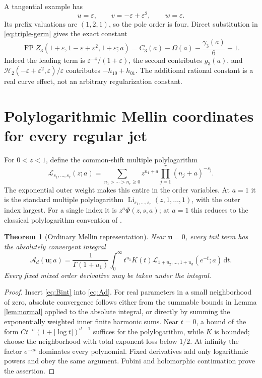 \documentclass[11pt,a4paper]{article}
\numberwithin{equation}{section}
\newtheorem{theorem}{Theorem}[section]
\theoremstyle{definition}\newtheorem{definition}[theorem]{Definition}
\theoremstyle{remark}\newtheorem{remark}[theorem]{Remark}
\DeclareMathOperator{\Li}{Li}
\DeclareMathOperator{\FP}{FP}
\newcommand{\eps}{\varepsilon}
\newcommand{\HH}{\mathcal H}
\newcommand{\Atail}{\mathcal A}
\newcommand{\LL}{\mathcal L}
\newcommand{\dd}{\,\mathrm d}
\begin{document}
A tangential example has
\[
 u=\eps,\qquad v=-\eps+\eps^2,\qquad w=\eps.
\]
Its prefix valuations are $(1,2,1)$, so the pole order is four. Direct
substitution in \eqref{eq:triple-germ} gives the exact constant
\begin{equation}\label{eq:tangent}
 \boxed{\displaystyle
 \FP Z_3(1+\eps,1-\eps+\eps^2,1+\eps;a)
   =C_3(a)-\Omega(a)-\frac{\gamma_3(a)}6+1.}
\end{equation}
Indeed the leading term is $\eps^{-4}/(1+\eps)$, the second contributes
$g_3(a)$, and $\HH_2(-\eps+\eps^2,\eps)/\eps$ contributes
$-h_{10}+h_{01}$. The additional rational constant is a real curve effect,
not an arbitrary regularization constant.

\section{Polylogarithmic Mellin coordinates for every regular jet}
\label{sec:mellin}

For $0<z<1$, define the common-shift multiple polylogarithm
\begin{equation}\label{eq:Lshift}
 \LL_{s_1,\ldots,s_r}(z;a)
 =\sum_{n_1>\cdots>n_r\ge0}z^{n_1+a}
                       \prod_{j=1}^{r}(n_j+a)^{-s_j}.
\end{equation}
The exponential outer weight makes this entire in the order variables.
At $a=1$ it is the standard multiple polylogarithm
$\Li_{s_1,\ldots,s_r}(z,1,\ldots,1)$, with the outer index largest.
For a single index it is $z^a\Phi(z,s,a)$; at $a=1$ this
reduces to the classical polylogarithm convention of \cite{dlmf-polylog}.

\begin{theorem}[Ordinary Mellin representation]\label{thm:Mellin}
Near $\bm u=0$, every tail term has the absolutely convergent integral
\begin{equation}\label{eq:AMellin}
 \boxed{\displaystyle
 \Atail_d(\bm u;a)=\frac1{\Gamma(1+u_1)}
 \int_0^\infty t^{u_1}K(t)
          \LL_{1+u_2,\ldots,1+u_d}(e^{-t};a)\dd t.}
\end{equation}
Every fixed mixed order derivative may be taken under the integral.
\end{theorem}
\begin{proof}
Insert \eqref{eq:Bint} into \eqref{eq:Ad}. For real parameters in a small
neighborhood of zero, absolute convergence follows either from the
summable bounds in Lemma \ref{lem:normal} applied to the absolute integral,
or directly by summing the exponentially weighted inner finite harmonic
sums. Near $t=0$, a bound of the form
$C t^{-\sigma}(1+|\log t|)^{d-1}$ suffices for the polylogarithm, while
$K$ is bounded; choose the neighborhood with total exponent loss below
$1/2$. At infinity the factor $e^{-at}$ dominates every polynomial.
Fixed derivatives add only logarithmic powers and obey the same argument.
Fubini and holomorphic continuation prove the assertion.
\end{proof}
\end{document}
